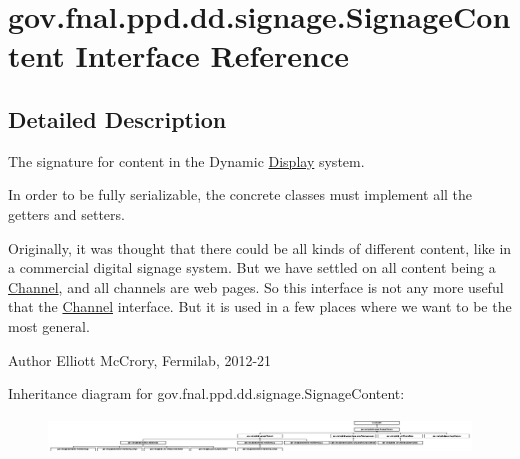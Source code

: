 \hypertarget{interfacegov_1_1fnal_1_1ppd_1_1dd_1_1signage_1_1SignageContent}{\section{gov.\-fnal.\-ppd.\-dd.\-signage.\-Signage\-Content Interface Reference}
\label{interfacegov_1_1fnal_1_1ppd_1_1dd_1_1signage_1_1SignageContent}
}


\subsection{Detailed Description}
The signature for content in the Dynamic \hyperlink{interfacegov_1_1fnal_1_1ppd_1_1dd_1_1signage_1_1Display}{Display} system. 

In order to be fully serializable, the concrete classes must implement all the getters and setters. 

Originally, it was thought that there could be all kinds of different content, like in a commercial digital signage system. But we have settled on all content being a \hyperlink{interfacegov_1_1fnal_1_1ppd_1_1dd_1_1signage_1_1Channel}{Channel}, and all channels are web pages. So this interface is not any more useful that the \hyperlink{interfacegov_1_1fnal_1_1ppd_1_1dd_1_1signage_1_1Channel}{Channel} interface. But it is used in a few places where we want to be the most general. 

\begin{DoxyAuthor}{Author}
Elliott Mc\-Crory, Fermilab, 2012-\/21 
\end{DoxyAuthor}
Inheritance diagram for gov.\-fnal.\-ppd.\-dd.\-signage.\-Signage\-Content\-:\begin{figure}[H]
\begin{center}
\leavevmode
\includegraphics[height=0.963192cm]{interfacegov_1_1fnal_1_1ppd_1_1dd_1_1signage_1_1SignageContent}
\end{center}
\end{figure}
